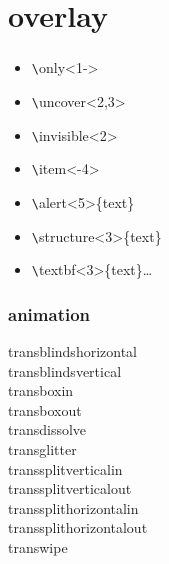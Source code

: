 \documentclass[11pt]{beamer}
\begin{document}
\section{overlay}
\begin{frame}[containsverbatim]
\frametitle{\secname}
\begin{itemize}
  \item \verb|\|only<1->
  \item \verb|\|uncover<2,3>
  \item \verb|\|invisible<2>
  \item \verb|\|item<-4>
  \item \verb|\|alert<5>\{text\}        
  \item \verb|\|structure<3>\{text\}
  \item \verb|\|textbf<3>\{text\}\ldots
\end{itemize}
\end{frame}


\begin{frame}
\frametitle{animation}
  \transblindshorizontal transblindshorizontal\\
  \transblindsvertical transblindsvertical\\
  \transboxin transboxin\\
  \transboxout transboxout\\
  \transdissolve transdissolve\\
  \transglitter[direction=90] transglitter\\
  \transsplitverticalin transsplitverticalin\\
  \transsplitverticalout transsplitverticalout\\
  \transsplithorizontalin transsplithorizontalin\\
  \transsplithorizontalout transsplithorizontalout\\
  \transwipe transwipe\\

\end{frame}
\end{document}
